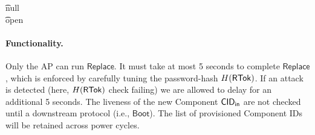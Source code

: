 \begin{pcimage}
{%
\t {} \gets \textsf{null} \\
\t {} \gets \textsf{open} %
}
\end{pcimage}




\paragraph{Functionality.}  Only the AP can run $\mathsf{Replace}$. It must take at most 5 seconds to complete $\mathsf{Replace}$, which is enforced by carefully tuning the password-hash $H(\mathsf{RTok})$. If an attack is detected (here, $H(\mathsf{RTok})$ check failing) we are allowed to delay for an additional 5 seconds. The liveness of the new Component $\mathsf{CID}_{\textsf{in}}$ are not checked until a downstream protocol (i.e., $\mathsf{Boot}$). The list of provisioned Component IDs \provcid will be retained across power cycles.

